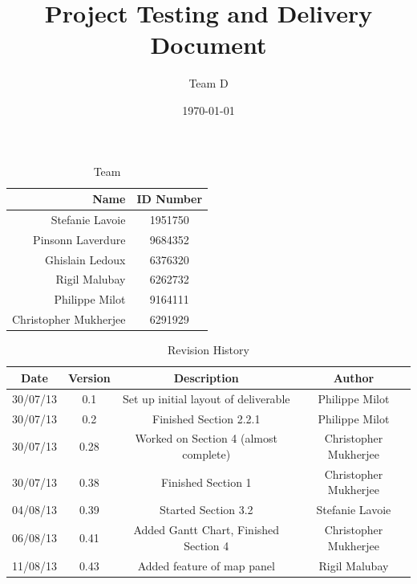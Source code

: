 \documentclass{article}
\begin{document}
\title{Project Testing and Delivery Document}
\author{Team D}
\date{\today}

\maketitle

\vspace*{3.5in}
\begin{table}[htbp]
\caption{Team}
\begin{center}
\begin{tabular}{|r | c|}
\hline
Name & ID Number \\
\hline\hline
Stefanie Lavoie & 1951750 \\
Pinsonn Laverdure & 9684352 \\
Ghislain Ledoux & 6376320 \\
Rigil Malubay & 6262732 \\
Philippe Milot & 9164111 \\
Christopher Mukherjee & 6291929 \\
\hline
\end{tabular}
\end{center}
\end{table}

\clearpage

\begin{table}[htbp]
\caption{Revision History}
\begin{center}
\begin{tabular}{|c | c | c | c| }
\hline
Date & Version & Description & Author \\
\hline\hline
30/07/13 & 0.1 & Set up initial layout of deliverable & Philippe Milot \\
\hline
30/07/13 & 0.2 & Finished Section 2.2.1 & Philippe Milot \\
\hline
30/07/13 & 0.28 & Worked on Section 4 (almost complete) & Christopher Mukherjee \\
\hline
30/07/13 & 0.38 & Finished Section 1 & Christopher Mukherjee \\
\hline
04/08/13 & 0.39 & Started Section 3.2 & Stefanie Lavoie \\
\hline
06/08/13 & 0.41 & Added Gantt Chart, Finished Section 4 & Christopher Mukherjee \\
\hline
11/08/13 & 0.43 & Added feature of map panel & Rigil Malubay \\
\hline
\end{tabular}
\end{center}
\end{table}
\end{document}
